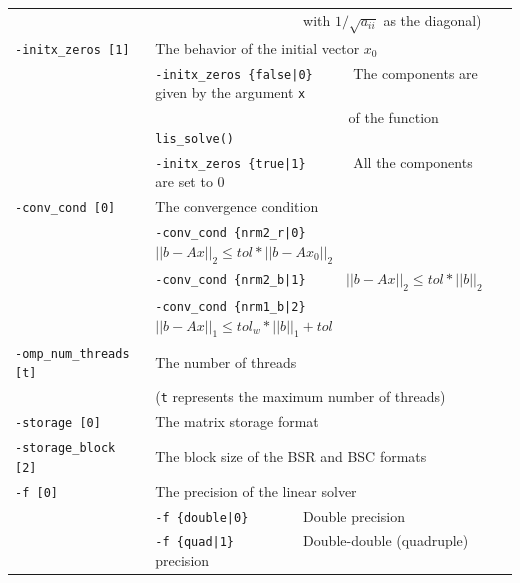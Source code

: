 \documentclass[a4paper]{article}
\begin{document}
\begin{minipage}[t]{\textwidth}
\begin{center}
\begin{tabular}{l|ll}
                       & \verb=                    =  with $1/\sqrt{a_{ii}}$ as the diagonal) \\ 
\verb=-initx_zeros [1]= & The behavior of the initial vector $x_{0}$  \\
                       & \verb=-initx_zeros {false|0}     =  The components are given by the argument \verb=x= \\
                       & \verb=                           =  of the function \verb=lis_solve()= \\
                       & \verb=-initx_zeros {true|1}      =  All the components are set to $0$ \\
\verb=-conv_cond [0]= & The convergence condition  \\
                       & \verb=-conv_cond {nrm2_r|0}     =  $||b-Ax||_2 \le tol * ||b-Ax_0||_2$ \\
                       & \verb=-conv_cond {nrm2_b|1}     =  $||b-Ax||_2 \le tol * ||b||_2$ \\
                       & \verb=-conv_cond {nrm1_b|2}     =  $||b-Ax||_1 \le tol_w * ||b||_1 + tol$\\
\verb=-omp_num_threads [t]= & The number of threads        \\ 
                            & (\verb=t= represents the maximum number of
 threads) \\
\verb=-storage [0]=    & The matrix storage format \\
\verb=-storage_block [2]=& The block size of the BSR and BSC formats\\ 
\verb=-f [0]=          & The precision of the linear solver\\
                       & \verb=-f {double|0}       =  Double precision \\ 
                       & \verb=-f {quad|1}         =  Double-double (quadruple) precision \\
\hline         
\end{tabular}
\end{center}
\end{minipage}

\newpage
\end{document}
